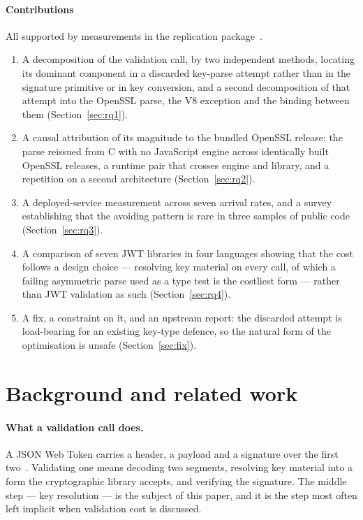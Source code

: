 \documentclass[pdflatex,sn-basic,twocolumn]{sn-jnl}%
\begin{document}
\paragraph{Contributions} All supported by measurements in the replication
package~\citep{artifact2026}.

\begin{enumerate}
\item A decomposition of the validation call, by two independent methods,
      locating its dominant component in a discarded key-parse attempt rather
      than in the signature primitive or in key conversion, and a second
      decomposition of that attempt into the OpenSSL parse, the V8 exception
      and the binding between them (Section~\ref{sec:rq1}).
\item A causal attribution of its magnitude to the bundled OpenSSL release: the
      parse reissued from C with no JavaScript engine across
      \CProbeVersionCount{} identically built OpenSSL releases, a runtime pair
      that crosses engine and library, and a repetition on a second
      architecture (Section~\ref{sec:rq2}).
\item A deployed-service measurement across seven arrival rates, and a survey
      establishing that the avoiding pattern is rare in three samples of public
      code (Section~\ref{sec:rq3}).
\item A comparison of seven JWT libraries in four languages showing that the
      cost follows a design choice --- resolving key material on every call,
      of which a failing asymmetric parse used as a type test is the costliest
      form --- rather than JWT validation as such (Section~\ref{sec:rq4}).
\item A fix, a constraint on it, and an upstream report: the discarded attempt
      is load-bearing for an existing key-type defence, so the natural form of
      the optimisation is unsafe (Section~\ref{sec:fix}).
\end{enumerate}

\section{Background and related work}\label{sec:related}

\paragraph{What a validation call does.} A JSON Web Token carries a header, a
payload and a signature over the first two~\citep{rfc7519}. Validating one means
decoding two segments, resolving key material into a form the cryptographic
library accepts, and verifying the signature. The middle step --- key
resolution --- is the subject of this paper, and it is the step most often left
implicit when validation cost is discussed.
\end{document}
